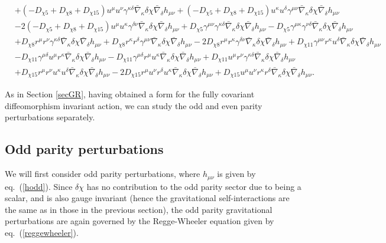 \documentclass[10pt,twocolumn,preprintnumbers,amsmath,amssymb,nofootinbib
,superscriptaddress]{revtex4-1}
\begin{document}
\begin{widetext}
\begin{align}
 &+\left(-D_{\chi5}+D_{\chi8}+D_{\chi15}\right)u^\mu u^\nu \gamma^{\kappa\delta} \bar{\nabla}_\kappa\delta\chi\bar{\nabla}_\delta h_{\mu\nu} + \left(-D_{\chi5}+D_{\chi8}+D_{\chi15}\right)u^\kappa u^\delta \gamma^{\mu\nu} \bar{\nabla}_\kappa\delta\chi\bar{\nabla}_\delta h_{\mu\nu} \nonumber\\
 & -2\left(-D_{\chi5}+D_{\chi8}+D_{\chi15}\right) u^\mu u^\kappa \gamma^{\delta\nu} \bar{\nabla}_\kappa\delta\chi\bar{\nabla}_\delta h_{\mu\nu} + D_{\chi5}\gamma^{\mu\nu}\gamma^{\kappa\delta} \bar{\nabla}_\kappa\delta\chi\bar{\nabla}_\delta h_{\mu\nu} - D_{\chi5}\gamma^{\mu\kappa}\gamma^{\nu\delta} \bar{\nabla}_\kappa\delta\chi\bar{\nabla}_\delta h_{\mu\nu}\nonumber\\
 &+D_{\chi8}r^\mu r^\nu \gamma^{\kappa\delta} \bar{\nabla}_\kappa\delta\chi\bar{\nabla}_\delta h_{\mu\nu} + D_{\chi8}r^\kappa r^\delta \gamma^{\mu\nu} \bar{\nabla}_\kappa\delta\chi\bar{\nabla}_\delta h_{\mu\nu}-2 D_{\chi8} r^\mu r^\kappa \gamma^{\delta\nu} \bar{\nabla}_\kappa\delta\chi\bar{\nabla}_\delta h_{\mu\nu}+D_{\chi11}\gamma^{\mu\nu}r^\kappa u^\delta \bar{\nabla}_\kappa\delta\chi\bar{\nabla}_\delta h_{\mu\nu}\nonumber\\
 & -D_{\chi11}\gamma^{\mu\delta}u^\mu r^\kappa \bar{\nabla}_\kappa\delta\chi\bar{\nabla}_\delta h_{\mu\nu}-D_{\chi11}\gamma^{\mu\delta}r^\mu u^\kappa \bar{\nabla}_\kappa\delta\chi\bar{\nabla}_\delta h_{\mu\nu} +D_{\chi11}u^\mu r^\nu \gamma^{\kappa\delta} \bar{\nabla}_\kappa\delta\chi\bar{\nabla}_\delta h_{\mu\nu}\nonumber \\
 & +D_{\chi15}r^\mu r^\nu u^\kappa u^\delta \bar{\nabla}_\kappa\delta\chi\bar{\nabla}_\delta h_{\mu\nu}-2D_{\chi15}r^\mu u^\nu r^\delta u^\kappa \bar{\nabla}_\kappa\delta\chi\bar{\nabla}_\delta h_{\mu\nu} +D_{\chi15}u^\mu u^\nu r^\kappa r^\delta \bar{\nabla}_\kappa\delta\chi\bar{\nabla}_\delta h_{\mu\nu}.\label{Lchiplus}
 \end{align}
\end{widetext}
As in Section \ref{secGR}, having obtained a form for the fully covariant diffeomorphism invariant action, we can study the odd and even parity perturbations separately. 

\subsection{Odd parity perturbations}\label{STodd}
We will first consider odd parity perturbations, where $h_{\mu\nu}$ is given by eq.~(\ref{hodd}). Since $\delta\chi$ has no contribution to the odd parity sector due to being a scalar, and is also gauge invariant (hence the gravitational self-interactions are the same as in those in the previous section), the odd parity gravitational perturbations are again governed by the Regge-Wheeler equation given by eq.~(\ref{reggewheeler}).
\end{document}
